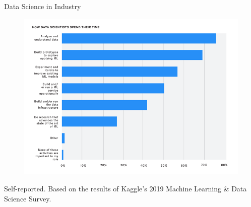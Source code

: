 \documentclass[aspectratio=169]{../latex_main/tntbeamer}  %
\begin{document}
    \begin{frame}{Data Science in Industry}
        \begin{figure}
            \centering
            \vspace{-2em}
            \includegraphics[scale= .7]{bild5}
        \end{figure}
        Self-reported. Based on the results of Kaggle’s 2019 Machine Learning \& Data Science Survey.
    \end{frame}
    
\end{document}
